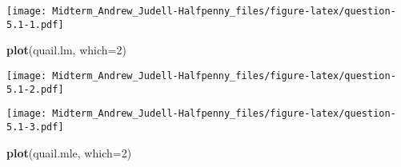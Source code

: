 \documentclass[]{article}
\newenvironment{Shaded}{\begin{snugshade}}{\end{snugshade}}
\newcommand{\KeywordTok}[1]{\textcolor[rgb]{0.13,0.29,0.53}{\textbf{#1}}}
\newcommand{\DataTypeTok}[1]{\textcolor[rgb]{0.13,0.29,0.53}{#1}}
\newcommand{\DecValTok}[1]{\textcolor[rgb]{0.00,0.00,0.81}{#1}}
\newcommand{\StringTok}[1]{\textcolor[rgb]{0.31,0.60,0.02}{#1}}
\newcommand{\CommentTok}[1]{\textcolor[rgb]{0.56,0.35,0.01}{\textit{#1}}}
\newcommand{\OperatorTok}[1]{\textcolor[rgb]{0.81,0.36,0.00}{\textbf{#1}}}
\newcommand{\NormalTok}[1]{#1}
\begin{document}
\begin{Shaded}
\end{Shaded}

\texttt{[image: Midterm\_Andrew\_Judell-Halfpenny\_files/figure-latex/question-5.1-1.pdf]}

\begin{Shaded}
\begin{Highlighting}[]
\KeywordTok{plot}\NormalTok{(quail.lm, }\DataTypeTok{which=}\DecValTok{2}\NormalTok{)}
\end{Highlighting}
\end{Shaded}

\texttt{[image: Midterm\_Andrew\_Judell-Halfpenny\_files/figure-latex/question-5.1-2.pdf]}

\begin{Shaded}
\end{Shaded}

\texttt{[image: Midterm\_Andrew\_Judell-Halfpenny\_files/figure-latex/question-5.1-3.pdf]}

\begin{Shaded}
\begin{Highlighting}[]
\KeywordTok{plot}\NormalTok{(quail.mle, }\DataTypeTok{which=}\DecValTok{2}\NormalTok{)}
\end{Highlighting}
\end{Shaded}
\end{document}
